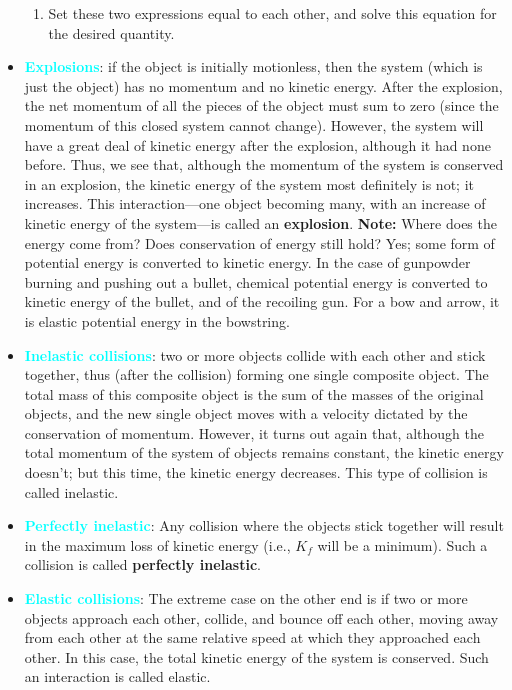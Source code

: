 \documentclass{report}
\begin{document}
\begin{itemize}
\begin{enumerate}
                \item Set these two expressions equal to each other, and solve this equation for the desired quantity.
            \end{enumerate}
        \item \textbf{\textcolor{cyan}{Explosions}}:
            if the object is initially motionless, then the system (which is just the object) has no momentum and no kinetic energy. After the explosion, the net momentum of all the pieces of the object must sum to zero (since the momentum of this closed system cannot change). However, the system will have a great deal of kinetic energy after the explosion, although it had none before. Thus, we see that, although the momentum of the system is conserved in an explosion, the kinetic energy of the system most definitely is not; it increases. This interaction—one object becoming many, with an increase of kinetic energy of the system—is called an \textbf{explosion}.
            \bigbreak \noindent 
            \textbf{Note:} Where does the energy come from? Does conservation of energy still hold? Yes; some form of potential energy is converted to kinetic energy. In the case of gunpowder burning and pushing out a bullet, chemical potential energy is converted to kinetic energy of the bullet, and of the recoiling gun. For a bow and arrow, it is elastic potential energy in the bowstring.
        \item \textbf{\textcolor{cyan}{Inelastic collisions}}:
            two or more objects collide with each other and stick together, thus (after the collision) forming one single composite object. The total mass of this composite object is the sum of the masses of the original objects, and the new single object moves with a velocity dictated by the conservation of momentum. However, it turns out again that, although the total momentum of the system of objects remains constant, the kinetic energy doesn’t; but this time, the kinetic energy decreases. This type of collision is called inelastic.
        \item \textbf{\textcolor{cyan}{Perfectly inelastic}}:
            Any collision where the objects stick together will result in the maximum loss of kinetic energy (i.e., $K_{f}$ will be a minimum). Such a collision is called \textbf{perfectly inelastic}.
        \item \textbf{\textcolor{cyan}{Elastic collisions}}:
            The extreme case on the other end is if two or more objects approach each other, collide, and bounce off each other, moving away from each other at the same relative speed at which they approached each other. In this case, the total kinetic energy of the system is conserved. Such an interaction is called elastic.

\end{itemize}
\end{document}
